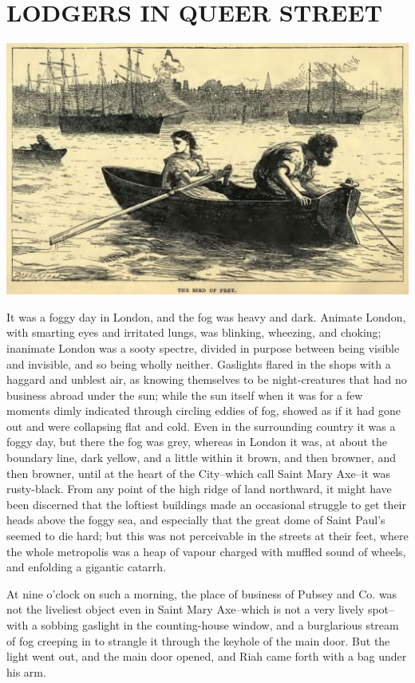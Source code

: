 
\chapter{LODGERS IN QUEER STREET}

\includegraphics[scale=2.3]{01-01-01}

It was a foggy day in London, and the fog was heavy and dark. Animate
London, with smarting eyes and irritated lungs, was blinking, wheezing,
and choking; inanimate London was a sooty spectre, divided in purpose
between being visible and invisible, and so being wholly neither.
Gaslights flared in the shops with a haggard and unblest air, as knowing
themselves to be night-creatures that had no business abroad under the
sun; while the sun itself when it was for a few moments dimly indicated
through circling eddies of fog, showed as if it had gone out and were
collapsing flat and cold. Even in the surrounding country it was a foggy
day, but there the fog was grey, whereas in London it was, at about
the boundary line, dark yellow, and a little within it brown, and then
browner, and then browner, until at the heart of the City--which call
Saint Mary Axe--it was rusty-black. From any point of the high ridge of
land northward, it might have been discerned that the loftiest buildings
made an occasional struggle to get their heads above the foggy sea, and
especially that the great dome of Saint Paul’s seemed to die hard; but
this was not perceivable in the streets at their feet, where the whole
metropolis was a heap of vapour charged with muffled sound of wheels,
and enfolding a gigantic catarrh.

At nine o’clock on such a morning, the place of business of Pubsey and
Co. was not the liveliest object even in Saint Mary Axe--which is not a
very lively spot--with a sobbing gaslight in the counting-house window,
and a burglarious stream of fog creeping in to strangle it through the
keyhole of the main door. But the light went out, and the main door
opened, and Riah came forth with a bag under his arm.

